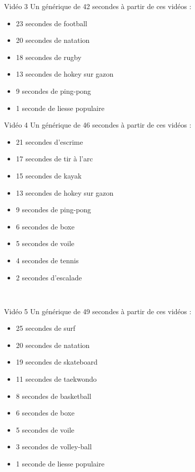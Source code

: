 \documentclass[10pt, a5paper,twoside]{article}
\begin{document}
\begin{card}[width = \textwidth, colback = olympicblue, colframe = olympicblue, bottomtitle = 2mm]{Vidéo 3}
  Un générique de 42 secondes à partir de ces vidéos :
  \vspace{-1mm}\begin{itemize}
    \item 23 secondes de football
    \item 20 secondes de natation
    \item 18 secondes de rugby
    \item 13 secondes de hokey sur gazon
    \item 9 secondes de ping-pong
    \item 1 seconde de liesse populaire
  \end{itemize}
\end{card}

\vfill

\begin{card}[width = \textwidth, colback = olympicblue, colframe = olympicblue, bottomtitle = 2mm]{Vidéo 4}
  Un générique de 46 secondes à partir de ces vidéos :
  \vspace{-1mm}\begin{itemize}
    \item 21 secondes d'escrime
    \item 17 secondes de tir à l'arc
    \item 15 secondes de kayak
    \item 13 secondes de hokey sur gazon
    \item 9 secondes de ping-pong
    \item 6 secondes de boxe
    \item 5 secondes de voile
    \item 4 secondes de tennis
    \item 2 secondes d'escalade
  \end{itemize}
\end{card}

\vfill

\clearpage
~
\vfill

\begin{card}[width = \textwidth, colback = olympicblue, colframe = olympicblue, bottomtitle = 2mm]{Vidéo 5}
  Un générique de 49 secondes à partir de ces vidéos :
  \vspace{-1mm}\begin{itemize}
    \item 25 secondes de surf
    \item 20 secondes de natation
    \item 19 secondes de skateboard
    \item 11 secondes de taekwondo
    \item 8 secondes de basketball
    \item 6 secondes de boxe
    \item 5 secondes de voile
    \item 3 secondes de volley-ball
    \item 1 seconde de liesse populaire
  \end{itemize}
\end{card}
\end{document}
